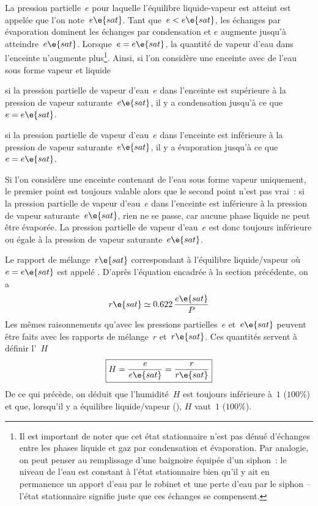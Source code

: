 
\sk
La pression partielle~$e$ pour laquelle l'équilibre liquide-vapeur est atteint est appelée  que l'on note~$e\e{sat}$. Tant que~$e<e\e{sat}$, les échanges par évaporation dominent les échanges par condensation et $e$ augmente jusqu'à atteindre~$e\e{sat}$. Lorsque~$e=e\e{sat}$, la quantité de vapeur d'eau dans l'enceinte n'augmente plus\footnote{Il est important de noter que cet état stationnaire n'est pas dénué d'échanges entre les phases liquide et gaz par condensation et évaporation. Par analogie, on peut penser au remplissage d'une baignoire équipée d'un siphon~: le niveau de l'eau est constant à l'état stationnaire bien qu'il y ait en permanence un apport d'eau par le robinet et une perte d'eau par le siphon -- l'état stationnaire signifie juste que ces échanges se compensent.}. Ainsi, si l'on considère une enceinte avec de l'eau sous forme vapeur et liquide
\begin{citemize}
\item si la pression partielle de vapeur d'eau~$e$ dans l'enceinte est supérieure à la pression de vapeur saturante~$e\e{sat}$, il y a condensation jusqu'à ce que~$e=e\e{sat}$.
\item si la pression partielle de vapeur d'eau~$e$ dans l'enceinte est inférieure à la pression de vapeur saturante~$e\e{sat}$, il y a évaporation jusqu'à ce que~$e=e\e{sat}$.
\end{citemize}
Si l'on considère une enceinte contenant de l'eau sous forme vapeur uniquement, le premier point est toujours valable alors que le second point n'est pas vrai~: si la pression partielle de vapeur d'eau~$e$ dans l'enceinte est inférieure à la pression de vapeur saturante~$e\e{sat}$, rien ne se passe, car aucune phase liquide ne peut être évaporée. La pression partielle de vapeur d'eau~$e$ est donc toujours inférieure ou égale à la pression de vapeur saturante~$e\e{sat}$. 

\sk
Le rapport de mélange~$r\e{sat}$ correspondant à l'équilibre liquide/vapeur où $e=e\e{sat}$ est appelé . D'après l'équation encadrée à la section précédente, on a 
\[ r\e{sat} \simeq 0.622 \, \frac{e\e{sat}}{P} \]
Les mêmes raisonnements qu'avec les pressions partielles~$e$ et~$e\e{sat}$ peuvent être faits avec les rapports de mélange~$r$ et~$r\e{sat}$. Ces quantités servent à définir l'~$H$
\[ \boxed{ H = \frac{e}{e\e{sat}} = \frac{r}{r\e{sat}} } \]
De ce qui précède, on déduit que l'humidité~$H$ est toujours inférieure à~$1$ ($100\%$) et que, lorsqu'il y a équilibre liquide/vapeur (), $H$ vaut~$1$ ($100\%$).

